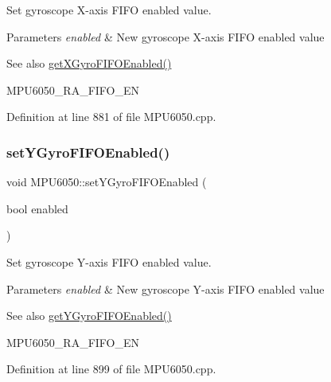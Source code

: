 Set gyroscope X-\/axis F\+I\+FO enabled value. 


\begin{DoxyParams}{Parameters}
{\em enabled} & New gyroscope X-\/axis F\+I\+FO enabled value \\
\hline
\end{DoxyParams}
\begin{DoxySeeAlso}{See also}
\mbox{\hyperlink{classMPU6050_ada9a553176b57815f23fb7d71bb85c9d}{get\+X\+Gyro\+F\+I\+F\+O\+Enabled()}} 

M\+P\+U6050\+\_\+\+R\+A\+\_\+\+F\+I\+F\+O\+\_\+\+EN 
\end{DoxySeeAlso}


Definition at line 881 of file M\+P\+U6050.\+cpp.

\mbox{\label{classMPU6050_a16eb12bbf07bc17a9d852941d834175e}} 
\subsubsection{\texorpdfstring{setYGyroFIFOEnabled()}{setYGyroFIFOEnabled()}}
{\footnotesize\ttfamily void M\+P\+U6050\+::set\+Y\+Gyro\+F\+I\+F\+O\+Enabled (\begin{DoxyParamCaption}\item[{bool}]{enabled }\end{DoxyParamCaption})}



Set gyroscope Y-\/axis F\+I\+FO enabled value. 


\begin{DoxyParams}{Parameters}
{\em enabled} & New gyroscope Y-\/axis F\+I\+FO enabled value \\
\hline
\end{DoxyParams}
\begin{DoxySeeAlso}{See also}
\mbox{\hyperlink{classMPU6050_a86c85d5b5c93df82394435b868e17463}{get\+Y\+Gyro\+F\+I\+F\+O\+Enabled()}} 

M\+P\+U6050\+\_\+\+R\+A\+\_\+\+F\+I\+F\+O\+\_\+\+EN 
\end{DoxySeeAlso}


Definition at line 899 of file M\+P\+U6050.\+cpp.

\mbox{\label{classMPU6050_a6d25a21e1673682f096399b719c66d2c}} 
